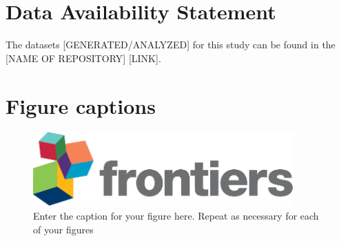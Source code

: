 \documentclass[utf8]{frontiersSCNS} %
\begin{document}
\section*{Data Availability Statement}
The datasets [GENERATED/ANALYZED] for this study can be found in the [NAME OF REPOSITORY] [LINK].




\section*{Figure captions}


\begin{figure}[h!]
\begin{center}
\includegraphics[width=10cm]{logo1}%
\end{center}
\caption{ Enter the caption for your figure here.  Repeat as  necessary for each of your figures}\label{fig:1}
\end{figure}
\end{document}
